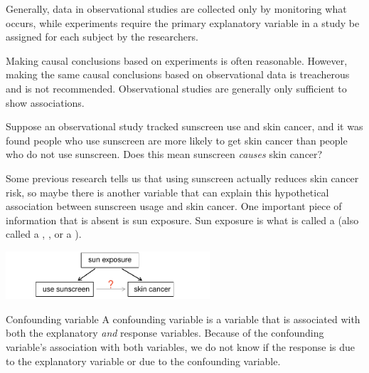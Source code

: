 Generally, data in observational studies are collected only by monitoring what occurs, while experiments require the primary explanatory variable in a study be assigned for each subject by the researchers.

Making causal conclusions based on experiments is often reasonable. However, making the same causal conclusions based on observational data is treacherous and is not recommended. Observational studies are generally only sufficient to show associations.

\begin{exercisewrap}
\begin{nexercise} \label{sunscreenLurkingExample}
Suppose an observational study tracked sunscreen use and skin cancer, and it was found people who use sunscreen are more likely to get skin cancer than people who do not use sunscreen. Does this mean sunscreen \emph{causes} skin cancer?\footnotemark
\end{nexercise}
\end{exercisewrap}

Some previous research tells us that using sunscreen actually reduces skin cancer risk, so maybe there is another variable that can explain this hypothetical association between sunscreen usage and skin cancer. One important piece of information that is absent is sun exposure. Sun exposure is what is called a  (also called a , , or a ).
\begin{center}
\includegraphics[width=0.57\textwidth]{ch_data_collection/figures/variables/sunCausesCancer}
\end{center}



\begin{onebox}{Confounding variable}
A confounding variable is a variable that is associated with both the explanatory \emph{and} response variables. Because of the confounding variable's association with both variables, we do not know if the response is due to the explanatory variable or due to the confounding variable.\end{onebox}

